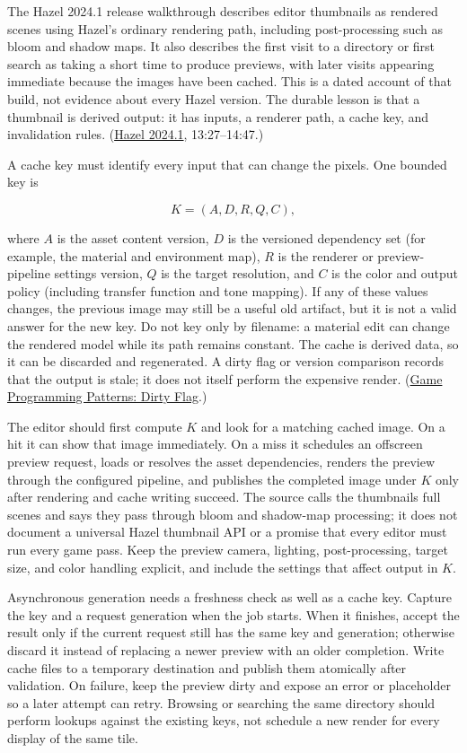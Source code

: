 The Hazel 2024.1 release walkthrough describes editor thumbnails as rendered scenes using Hazel's ordinary rendering path, including post-processing such as bloom and shadow maps. It also describes the first visit to a directory or first search as taking a short time to produce previews, with later visits appearing immediate because the images have been cached. This is a dated account of that build, not evidence about every Hazel version. The durable lesson is that a thumbnail is derived output: it has inputs, a renderer path, a cache key, and invalidation rules. (\href{https://www.youtube.com/watch?v=10OVd1VHEZ4&t=13m27s}{Hazel 2024.1}, 13:27--14:47.)

A cache key must identify every input that can change the pixels. One bounded key is

\[
K=(A,D,R,Q,C),
\]

where \(A\) is the asset content version, \(D\) is the versioned dependency set (for example, the material and environment map), \(R\) is the renderer or preview-pipeline settings version, \(Q\) is the target resolution, and \(C\) is the color and output policy (including transfer function and tone mapping). If any of these values changes, the previous image may still be a useful old artifact, but it is not a valid answer for the new key. Do not key only by filename: a material edit can change the rendered model while its path remains constant. The cache is derived data, so it can be discarded and regenerated. A dirty flag or version comparison records that the output is stale; it does not itself perform the expensive render. (\href{https://github.com/munificent/game-programming-patterns/blob/master/book/dirty-flag.markdown}{Game Programming Patterns: Dirty Flag}.)

The editor should first compute \(K\) and look for a matching cached image. On a hit it can show that image immediately. On a miss it schedules an offscreen preview request, loads or resolves the asset dependencies, renders the preview through the configured pipeline, and publishes the completed image under \(K\) only after rendering and cache writing succeed. The source calls the thumbnails full scenes and says they pass through bloom and shadow-map processing; it does not document a universal Hazel thumbnail API or a promise that every editor must run every game pass. Keep the preview camera, lighting, post-processing, target size, and color handling explicit, and include the settings that affect output in \(K\).

Asynchronous generation needs a freshness check as well as a cache key. Capture the key and a request generation when the job starts. When it finishes, accept the result only if the current request still has the same key and generation; otherwise discard it instead of replacing a newer preview with an older completion. Write cache files to a temporary destination and publish them atomically after validation. On failure, keep the preview dirty and expose an error or placeholder so a later attempt can retry. Browsing or searching the same directory should perform lookups against the existing keys, not schedule a new render for every display of the same tile.


